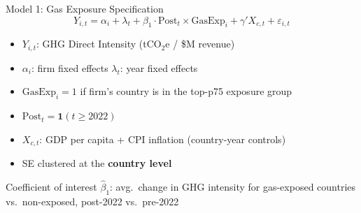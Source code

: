\documentclass[10pt]{beamer}
\begin{document}
\begin{frame}{Model 1: Gas Exposure Specification}
  \begin{equation}
    Y_{i,t} = \alpha_i + \lambda_t + \beta_1 \cdot \text{Post}_t \times \text{GasExp}_i + \gamma' X_{c,t} + \varepsilon_{i,t}
  \end{equation}

  \vspace{0.3em}

  \begin{itemize}
    \item $Y_{i,t}$: GHG Direct Intensity (tCO$_2$e / \$M revenue)
    \item $\alpha_i$: firm fixed effects \quad $\lambda_t$: year fixed effects
    \item $\text{GasExp}_i = 1$ if firm's country is in the top-p75 exposure group
    \item $\text{Post}_t = \mathbf{1}(t \geq 2022)$
    \item $X_{c,t}$: GDP per capita + CPI inflation (country-year controls)
    \item SE clustered at the \textbf{country level}
  \end{itemize}

  \vspace{0.4em}

  \begin{block}{Coefficient of interest}
    \small $\hat\beta_1$: avg.\ change in GHG intensity for gas-exposed countries vs.\ non-exposed, post-2022 vs.\ pre-2022
  \end{block}
\end{frame}

\end{document}
